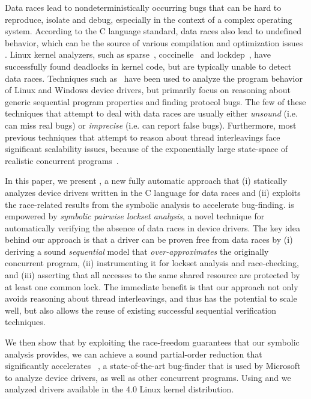 Data races lead to nondeterministically occurring bugs that can be hard to reproduce, isolate and debug, especially in the context of a complex operating system. According to the C language standard, data races also lead to undefined behavior, which can be the source of various compilation and optimization issues . Linux kernel analyzers, such as sparse~\cite{corbet2004sparse}, coccinelle~\cite{padioleau2008doc} and lockdep~\cite{corbet2006lock}, have successfully found deadlocks in kernel code, but are typically unable to detect data races. Techniques such as~\cite{ball2006thorough, clarke2004predicate, qadeer2004kiss, engler2000checking, henzinger2002temporal, cook2006termination, pratikakis2006locksmith, kuznetsov2010testing, renzelmann2012symdrive, lal2012corral} have been used to analyze the program behavior of Linux and Windows device drivers, but primarily focus on reasoning about generic sequential program properties and finding protocol bugs. The few of these techniques that attempt to deal with data races are usually either \emph{unsound} (i.e. can miss real bugs) or \emph{imprecise} (i.e. can report false bugs). Furthermore, most previous techniques that attempt to reason about thread interleavings face significant scalability issues, because of the exponentially large state-space of realistic concurrent programs~\cite{musuvathi2008finding}.

In this paper, we present \whoop, a new fully automatic approach that (i) statically analyzes device drivers written in the C language for data races and (ii) exploits the race-related results from the symbolic analysis to accelerate bug-finding. \whoop is empowered by \emph{symbolic pairwise lockset analysis}, a novel technique for automatically verifying the absence of data races in device drivers. The key idea behind our approach is that a driver can be proven free from data races by (i) deriving a sound \emph{sequential} model that \emph{over-approximates} the originally concurrent program, (ii) instrumenting it for lockset analysis and race-checking, and (iii) asserting that all accesses to the same shared resource are protected by at least one common lock. The immediate benefit is that our approach not only avoids reasoning about thread interleavings, and thus has the potential to scale well, but also allows the reuse of existing successful sequential verification techniques.

We then show that by exploiting the race-freedom guarantees that our symbolic analysis provides, we can achieve a sound partial-order reduction that significantly accelerates \corral~\cite{lal2012solver}, a state-of-the-art bug-finder that is used by Microsoft to analyze device drivers, as well as other concurrent programs. Using \whoop and \corral we analyzed \sizeOfBenchmarks drivers available in the 4.0 Linux kernel distribution.

